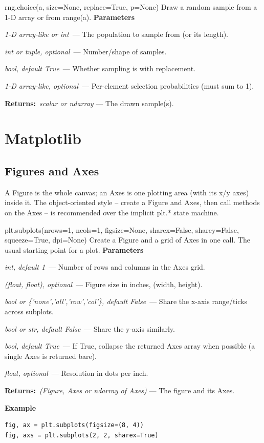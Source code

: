 \documentclass[10pt]{article}
\newenvironment{params}
  {\smallskip\textbf{\small\color{accent}Parameters}\par\nopagebreak
   \begin{description}[leftmargin=1.3em,itemsep=1.5pt,parsep=0pt,topsep=1pt,
      labelindent=0pt,style=sameline,font=\normalfont]}
  {\end{description}}
\newcommand{\pitem}[3]{\item[{\ttfamily\color{accent}#1}]{\itshape #2}\ --- #3}
\newcommand{\preturn}[2]{\smallskip\textbf{\small\color{accent}Returns:}\ {\itshape #1} --- #2\par}
\begin{document}
\begin{func}{rng.choice(a, size=None, replace=True, p=None)}
Draw a random sample from a 1-D array or from range(a).
\begin{params}
\pitem{a}{1-D array-like or int}{The population to sample from (or its length).}
\pitem{size}{int or tuple, optional}{Number/shape of samples.}
\pitem{replace}{bool, default True}{Whether sampling is with replacement.}
\pitem{p}{1-D array-like, optional}{Per-element selection probabilities (must sum to 1).}
\end{params}
\preturn{scalar or ndarray}{The drawn sample(s).}
\end{func}
\medskip

\section{Matplotlib}
\subsection{Figures and Axes}
A Figure is the whole canvas; an Axes is one plotting area (with its x/y axes) inside it. The object-oriented style -- create a Figure and Axes, then call methods on the Axes -- is recommended over the implicit plt.* state machine.

\begin{func}{plt.subplots(nrows=1, ncols=1, figsize=None, sharex=False, sharey=False, squeeze=True, dpi=None)}
Create a Figure and a grid of Axes in one call. The usual starting point for a plot.
\begin{params}
\pitem{nrows, ncols}{int, default 1}{Number of rows and columns in the Axes grid.}
\pitem{figsize}{(float, float), optional}{Figure size in inches, (width, height).}
\pitem{sharex}{bool or \{'none','all','row','col'\}, default False}{Share the x-axis range/ticks across subplots.}
\pitem{sharey}{bool or str, default False}{Share the y-axis similarly.}
\pitem{squeeze}{bool, default True}{If True, collapse the returned Axes array when possible (a single Axes is returned bare).}
\pitem{dpi}{float, optional}{Resolution in dots per inch.}
\end{params}
\preturn{(Figure, Axes or ndarray of Axes)}{The figure and its Axes.}
\smallskip\textbf{\small\color{accent}Example}
\begin{lstlisting}[style=py]
fig, ax = plt.subplots(figsize=(8, 4))
fig, axs = plt.subplots(2, 2, sharex=True)
\end{lstlisting}
\end{func}
\medskip
\end{document}
